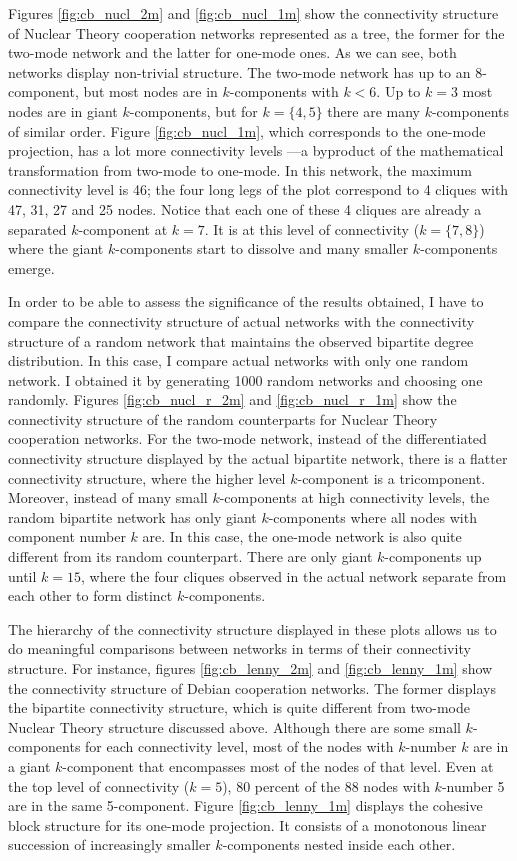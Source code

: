 Figures \ref{fig:cb_nucl_2m} and \ref{fig:cb_nucl_1m} show the connectivity structure of Nuclear Theory cooperation networks represented as a tree, the former for the two-mode network and the latter for one-mode ones. As we can see, both networks display non-trivial structure. The two-mode network has up to an 8-component, but most nodes are in $k$-components with $k < 6$. Up to $k = 3$ most nodes are in giant $k$-components, but for $k = \{4,5\}$ there are many $k$-components of similar order. Figure \ref{fig:cb_nucl_1m}, which corresponds to the one-mode projection, has a lot more connectivity levels ---a byproduct of the mathematical transformation from two-mode to one-mode. In this network, the maximum connectivity level is 46; the four long legs of the plot correspond to 4 cliques with 47, 31, 27 and 25 nodes. Notice that each one of these 4 cliques are already a separated $k$-component at $k=7$. It is at this level of connectivity ($k=\{7,8\}$) where the giant $k$-components start to dissolve and many smaller $k$-components emerge.

In order to be able to assess the significance of the results obtained, I have to compare the connectivity structure of actual networks with the connectivity structure of a random network that maintains the observed bipartite degree distribution. In this case, I compare actual networks with only one random network. I obtained it by generating 1000 random networks and choosing one randomly. Figures \ref{fig:cb_nucl_r_2m} and \ref{fig:cb_nucl_r_1m} show the connectivity structure of the random counterparts for Nuclear Theory cooperation networks. For the two-mode network, instead of the differentiated connectivity structure displayed by the actual bipartite network, there is a flatter connectivity structure, where the higher level $k$-component is a tricomponent. Moreover, instead of many small $k$-components at high connectivity levels, the random bipartite network has only giant $k$-components where all nodes with component number $k$ are. In this case, the one-mode network is also quite different from its random counterpart. There are only giant $k$-components up until $k=15$, where the four cliques observed in the actual network separate from each other to form distinct $k$-components.

The hierarchy of the connectivity structure displayed in these plots allows us to do meaningful comparisons between networks in terms of their connectivity structure. For instance, figures \ref{fig:cb_lenny_2m} and \ref{fig:cb_lenny_1m} show the connectivity structure of Debian cooperation networks. The former displays the bipartite connectivity structure, which is quite different from two-mode Nuclear Theory structure discussed above. Although there are some small $k$-components for each connectivity level, most of the nodes with $k$-number $k$ are in a giant $k$-component that encompasses most of the nodes of that level. Even at the top level of connectivity ($k=5$), 80 percent of the 88 nodes with $k$-number 5 are in the same 5-component. Figure \ref{fig:cb_lenny_1m} displays the cohesive block structure for its one-mode projection. It consists of a monotonous linear succession of increasingly smaller $k$-components nested inside each other. 

